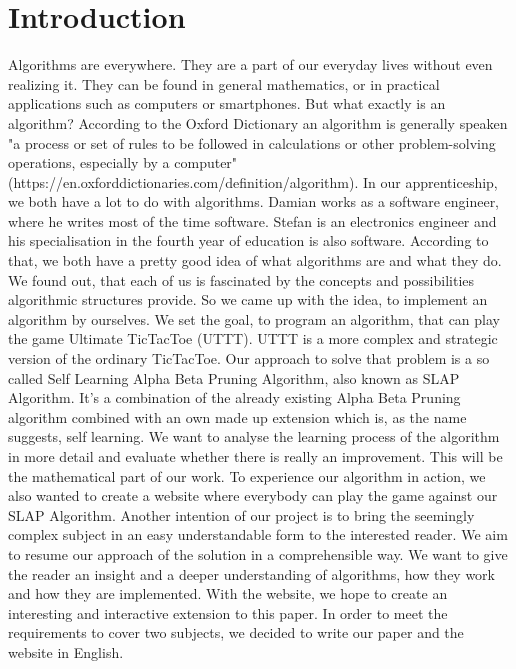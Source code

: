 \section{Introduction}
Algorithms are everywhere. They are a part of our everyday lives without even realizing it. They can be found in general mathematics, or in practical applications such as  computers or smartphones. But what exactly is an algorithm? According to the Oxford Dictionary an algorithm is generally speaken "a process or set of rules to be followed in calculations or other problem-solving operations, especially by a computer" (https://en.oxforddictionaries.com/definition/algorithm).
In our apprenticeship, we both have a lot to do with algorithms. Damian works as a software engineer, where he writes most of the time software. Stefan is an electronics engineer and his specialisation in the fourth year of education is also software. According to that, we both have a pretty good idea of what algorithms are and what they do. We found out, that each of us is fascinated by the concepts and possibilities algorithmic structures provide. So we came up with the idea, to implement an algorithm by ourselves. \bigskip
We set the goal, to program an algorithm, that can play the game Ultimate TicTacToe (UTTT). UTTT is a more complex and strategic version of the ordinary TicTacToe. 
Our approach to solve that problem is a so called Self Learning Alpha Beta Pruning Algorithm, also known as SLAP Algorithm. It's a combination of the already existing Alpha Beta Pruning algorithm combined with an own made up extension which is, as the name suggests, self learning. We want to analyse the learning process of the algorithm in more detail and evaluate whether there is really an improvement. This will be the mathematical part of our work.
To experience our algorithm in action, we also wanted to create a website where everybody can play the game against our SLAP Algorithm.
Another intention of our project is to bring the seemingly complex subject in an easy understandable form to the interested reader. We aim to resume our approach of the solution in a comprehensible way. We want to give the reader an insight and a deeper understanding of algorithms, how they work and how they are implemented. With the website, we hope to create an interesting and interactive extension to this paper.
In order to meet the requirements to cover two subjects, we decided to write our paper and the website in English. \vspace{8mm}

